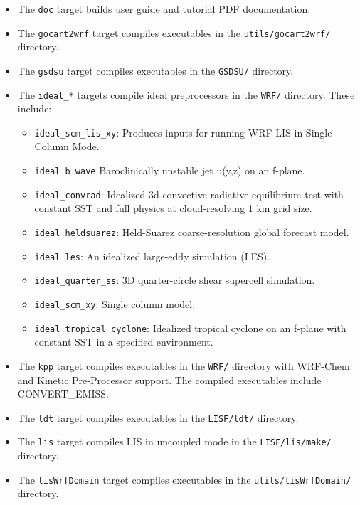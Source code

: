 \begin{itemize}
\begin{itemize}
  \item The \texttt{doc} target builds user guide and tutorial PDF documentation.

  \item The \texttt{gocart2wrf} target compiles executables in the
    \texttt{utils/gocart2wrf/} directory. 

  \item The \texttt{gsdsu} target compiles executables in the \texttt{GSDSU/}
    directory.

  \item The \texttt{ideal\_*} targets compile ideal preprocessors in the \texttt{WRF/}
    directory.   These include:
  \begin{itemize}  
     \item \texttt{ideal\_scm\_lis\_xy}: Produces inputs for running WRF-LIS in Single Column Mode.
     \item \texttt{ideal\_b\_wave} Baroclinically unstable jet u(y,z) on an f-plane.
     \item \texttt{ideal\_convrad}: Idealized 3d convective-radiative equilibrium test with constant SST
   and full physics at cloud-resolving 1 km grid size.
     \item \texttt{ideal\_heldsuarez}: Held-Suarez coarse-resolution global forecast model.
     \item \texttt{ideal\_les}: An idealized large-eddy simulation (LES).
     \item \texttt{ideal\_quarter\_ss}: 3D quarter-circle shear supercell simulation.
     \item \texttt{ideal\_scm\_xy}: Single column model.
     \item \texttt{ideal\_tropical\_cyclone}: Idealized tropical cyclone on an f-plane with constant SST in a
   specified environment.
  \end{itemize}

  \item The \texttt{kpp} target compiles executables in the \texttt{WRF/}
    directory with WRF-Chem and Kinetic Pre-Processor
    support. The compiled executables include CONVERT\_EMISS.
  
  \item The \texttt{ldt} target compiles executables in the \texttt{LISF/ldt/} 
    directory.

  \item The \texttt{lis} target compiles LIS in uncoupled mode in the 
    \texttt{LISF/lis/make/} directory.

  \item The \texttt{lisWrfDomain} target compiles executables in the 
    \texttt{utils/lisWrfDomain/} directory.
    

\end{itemize}
\end{itemize}
